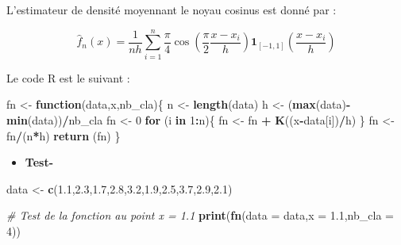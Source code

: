 \documentclass[
  12pt,
]{article}
\newenvironment{Shaded}{\begin{snugshade}}{\end{snugshade}}
\newcommand{\AttributeTok}[1]{\textcolor[rgb]{0.13,0.29,0.53}{#1}}
\newcommand{\CommentTok}[1]{\textcolor[rgb]{0.56,0.35,0.01}{\textit{#1}}}
\newcommand{\ControlFlowTok}[1]{\textcolor[rgb]{0.13,0.29,0.53}{\textbf{#1}}}
\newcommand{\DecValTok}[1]{\textcolor[rgb]{0.00,0.00,0.81}{#1}}
\newcommand{\FloatTok}[1]{\textcolor[rgb]{0.00,0.00,0.81}{#1}}
\newcommand{\FunctionTok}[1]{\textcolor[rgb]{0.13,0.29,0.53}{\textbf{#1}}}
\newcommand{\NormalTok}[1]{#1}
\newcommand{\OtherTok}[1]{\textcolor[rgb]{0.56,0.35,0.01}{#1}}
\newcommand{\SpecialCharTok}[1]{\textcolor[rgb]{0.81,0.36,0.00}{\textbf{#1}}}
\providecommand{\tightlist}{%
  \setlength{\itemsep}{0pt}\setlength{\parskip}{0pt}}
\begin{document}
L'estimateur de densité moyennant le noyau cosinus est donné par :

\[\hat{f}_n(x) = \frac{1}{n h} \sum_{i=1}^n \frac{\pi}{4} \cos\left(\frac{\pi}{2} \frac{x - x_i}{h}\right) \mathbf{1}_{[-1,1]}\left(\frac{x - x_i}{h}\right)\]

Le code R est le suivant :

\begin{Shaded}
\begin{Highlighting}[]
\NormalTok{fn }\OtherTok{\textless{}{-}} \ControlFlowTok{function}\NormalTok{(data,x,nb\_cla)\{}
\NormalTok{  n }\OtherTok{\textless{}{-}} \FunctionTok{length}\NormalTok{(data)}
\NormalTok{  h }\OtherTok{\textless{}{-}}\NormalTok{ (}\FunctionTok{max}\NormalTok{(data)}\SpecialCharTok{{-}}\FunctionTok{min}\NormalTok{(data))}\SpecialCharTok{/}\NormalTok{nb\_cla}
\NormalTok{  fn }\OtherTok{\textless{}{-}} \DecValTok{0}
  \ControlFlowTok{for}\NormalTok{ (i }\ControlFlowTok{in} \DecValTok{1}\SpecialCharTok{:}\NormalTok{n)\{}
\NormalTok{    fn }\OtherTok{\textless{}{-}}\NormalTok{ fn }\SpecialCharTok{+} \FunctionTok{K}\NormalTok{((x}\SpecialCharTok{{-}}\NormalTok{data[i])}\SpecialCharTok{/}\NormalTok{h)}
\NormalTok{  \}}
\NormalTok{  fn }\OtherTok{\textless{}{-}}\NormalTok{ fn}\SpecialCharTok{/}\NormalTok{(n}\SpecialCharTok{*}\NormalTok{h)}
  \FunctionTok{return}\NormalTok{ (fn)}
\NormalTok{\}}
\end{Highlighting}
\end{Shaded}

\begin{itemize}
\tightlist
\item
  \textbf{Test- }
\end{itemize}

\begin{Shaded}
\begin{Highlighting}[]
\NormalTok{data }\OtherTok{\textless{}{-}} \FunctionTok{c}\NormalTok{(}\FloatTok{1.1}\NormalTok{,}\FloatTok{2.3}\NormalTok{,}\FloatTok{1.7}\NormalTok{,}\FloatTok{2.8}\NormalTok{,}\FloatTok{3.2}\NormalTok{,}\FloatTok{1.9}\NormalTok{,}\FloatTok{2.5}\NormalTok{,}\FloatTok{3.7}\NormalTok{,}\FloatTok{2.9}\NormalTok{,}\FloatTok{2.1}\NormalTok{)}

\CommentTok{\# Test de la fonction au point x = 1.1}
\FunctionTok{print}\NormalTok{(}\FunctionTok{fn}\NormalTok{(}\AttributeTok{data =}\NormalTok{ data,}\AttributeTok{x =} \FloatTok{1.1}\NormalTok{,}\AttributeTok{nb\_cla =} \DecValTok{4}\NormalTok{))}
\end{Highlighting}
\end{Shaded}
\end{document}
